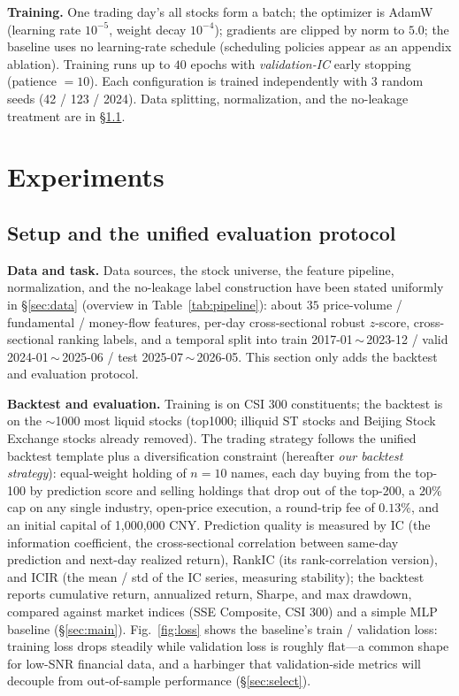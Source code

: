 \documentclass[a4paper,11pt]{article}
\begin{document}
\textbf{Training.} One trading day's all stocks form a batch; the
optimizer is AdamW (learning rate $10^{-5}$, weight decay $10^{-4}$); gradients
are clipped by norm to $5.0$; the baseline uses no learning-rate schedule
(scheduling policies appear as an appendix ablation). Training runs up to $40$
epochs with \emph{validation-IC} early stopping (patience $=10$). Each
configuration is trained independently with 3 random seeds (42 / 123 / 2024).
Data splitting, normalization, and the no-leakage treatment are in
\S\ref{sec:setup}.

\section{Experiments}\label{sec:exp}

\subsection{Setup and the unified evaluation protocol}\label{sec:setup}

\textbf{Data and task.} Data sources, the stock universe, the feature
pipeline, normalization, and the no-leakage label construction have been stated
uniformly in \S\ref{sec:data} (overview in Table~\ref{tab:pipeline}): about
$35$ price-volume / fundamental / money-flow features, per-day cross-sectional
robust $z$-score, cross-sectional ranking labels, and a temporal split into
train 2017-01\,$\sim$\,2023-12 / valid 2024-01\,$\sim$\,2025-06 / test
2025-07\,$\sim$\,2026-05. This section only adds the backtest and evaluation
protocol.

\textbf{Backtest and evaluation.} Training is on CSI 300 constituents;
the backtest is on the $\sim$1000 most liquid stocks (top1000; illiquid ST
stocks and Beijing Stock Exchange stocks already removed). The trading
strategy follows the unified backtest template plus a diversification
constraint (hereafter \emph{our backtest strategy}): equal-weight holding of
$n{=}10$ names, each day buying from the top-100 by prediction score and
selling holdings that drop out of the top-200, a $20\%$ cap on any single
industry, open-price execution, a round-trip fee of $0.13\%$, and an initial
capital of 1,000,000 CNY. Prediction quality is measured by IC (the information
coefficient, the cross-sectional correlation between same-day prediction and
next-day realized return), RankIC (its rank-correlation version), and ICIR (the
mean / std of the IC series, measuring stability); the backtest reports
cumulative return, annualized return, Sharpe, and max drawdown, compared
against market indices (SSE Composite, CSI 300) and a simple MLP baseline
(\S\ref{sec:main}). Fig.~\ref{fig:loss} shows the baseline's train / validation
loss: training loss drops steadily while validation loss is roughly flat---a
common shape for low-SNR financial data, and a harbinger that validation-side
metrics will decouple from out-of-sample performance (\S\ref{sec:select}).
\end{document}
